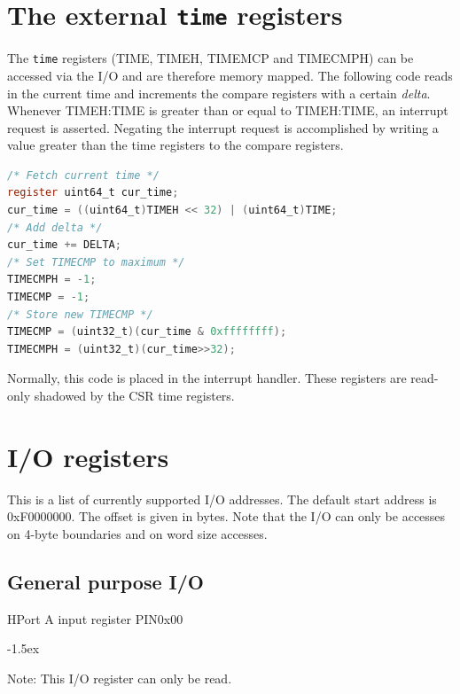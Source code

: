 \documentclass[12pt]{article}
\begin{document}
\section{The external \texttt{time} registers}
The \texttt{time} registers (TIME, TIMEH, TIMEMCP and TIMECMPH) can be accessed via the I/O and are therefore memory mapped. The following code reads in the current time and increments the compare registers with a certain \emph{delta}. Whenever TIMEH:TIME is greater than or equal to TIMEH:TIME, an interrupt request is asserted. Negating the interrupt request is accomplished by writing a value greater than the time registers to the compare registers.

\begin{lstlisting}[language=C]
/* Fetch current time */
register uint64_t cur_time;
cur_time = ((uint64_t)TIMEH << 32) | (uint64_t)TIME;
/* Add delta */
cur_time += DELTA;
/* Set TIMECMP to maximum */
TIMECMPH = -1;
TIMECMP = -1;
/* Store new TIMECMP */
TIMECMP = (uint32_t)(cur_time & 0xffffffff);
TIMECMPH = (uint32_t)(cur_time>>32);
\end{lstlisting}

Normally, this code is placed in the interrupt handler. These registers are read-only shadowed by the CSR time registers.

\section{I/O registers}
\label{sec:ioregisters}
This is a list of currently supported I/O addresses. 
The default start address is 0xF0000000. The offset is given in bytes. Note that the I/O can only be accesses on 4-byte boundaries and on word size accesses.

\subsection{General purpose I/O}

\begin{register}{H}{Port A input register PIN}{0x00}%
\label{pinx}%
\regnewline%
\end{register}
\begin{regdesc}[0.6\textwidth]\begin{reglist}[000000000]
\itemsep-1.5ex
\item[Note:] This I/O register can only be read.
\end{reglist}\end{regdesc}
\end{document}
